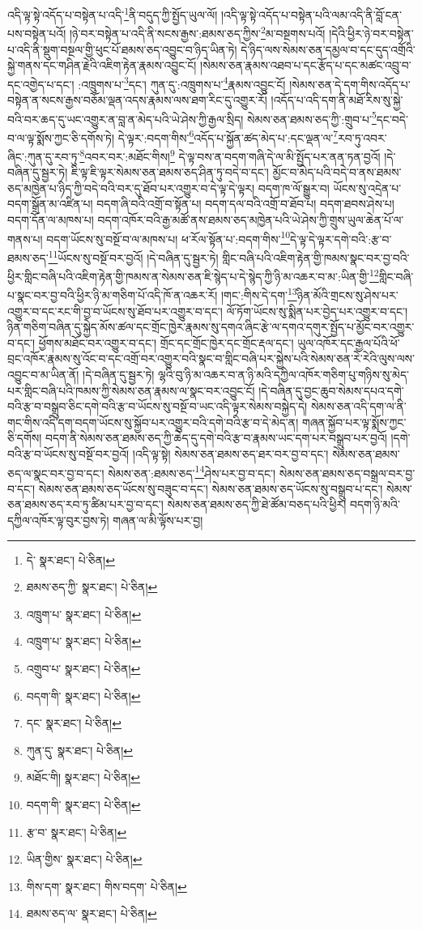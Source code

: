 འདི་ལྟ་སྟེ་འདོད་པ་བསྟེན་པ་འདི་\footnote{དེ་  སྣར་ཐང་།  པེ་ཅིན། }ནི་བདུད་ཀྱི་སྤྱོད་ཡུལ་ལོ། །འདི་ལྟ་སྟེ་འདོད་པ་བསྟེན་པའི་ལམ་འདི་ནི་བློ་ངན་པས་བསྟེན་པའོ། །ཉེ་བར་བསྟེན་པ་འདི་ནི་སངས་རྒྱས་:ཐམས་ཅད་ཀྱིས་\footnote{ཐམས་ཅད་ཀྱི་  སྣར་ཐང་།  པེ་ཅིན། }མ་བསྔགས་པའོ། །དེའི་ཕྱིར་ཉེ་བར་བསྟེན་པ་འདི་ནི་སྡུག་བསྔལ་གྱི་ཕུང་པོ་ཐམས་ཅད་འབྱུང་བ་ཉིད་ཡིན་ཏེ། དེ་ཉིད་ལས་སེམས་ཅན་དམྱལ་བ་དང་དུད་འགྲོའི་སྐྱེ་གནས་དང་གཤིན་རྗེའི་འཇིག་རྟེན་རྣམས་འབྱུང་ངོ། །སེམས་ཅན་རྣམས་འཐབ་པ་དང་རྩོད་པ་དང་མཚང་འབྲུ་བ་དང་འགྱེད་པ་དང་། :འཁྲུགས་པ་\footnote{འཁྲུག་པ་  སྣར་ཐང་།  པེ་ཅིན། }དང་། ཀུན་དུ་:འཁྲུགས་པ་\footnote{འཁྲུག་པ་  སྣར་ཐང་།  པེ་ཅིན། }རྣམས་འབྱུང་ངོ། །སེམས་ཅན་དེ་དག་གིས་འདོད་པ་བསྟེན་ན་སངས་རྒྱས་བཅོམ་ལྡན་འདས་རྣམས་ལས་ཐག་རིང་དུ་འགྱུར་རོ། །འདོད་པ་འདི་དག་ནི་མཐོ་རིས་སུ་སྐྱེ་བའི་བར་ཆད་དུ་ཡང་འགྱུར་ན་བླ་ན་མེད་པའི་ཡེ་ཤེས་ཀྱི་རྒྱལ་སྲིད། སེམས་ཅན་ཐམས་ཅད་ཀྱི་:གྲུབ་པ་\footnote{འགྲུབ་པ་  སྣར་ཐང་།  པེ་ཅིན། }དང་བདེ་བ་ལ་ལྟ་སྨོས་ཀྱང་ཅི་དགོས་ཏེ། དེ་ལྟར་:བདག་གིས་\footnote{བདག་གི་  སྣར་ཐང་།  པེ་ཅིན། }འདོད་པ་སྐྱོན་ཚད་མེད་པ་:དང་ལྡན་ལ་\footnote{དང་  སྣར་ཐང་།  པེ་ཅིན། }རབ་ཏུ་འབར་ཞིང་:ཀུན་དུ་རབ་ཏུ་\footnote{ཀུན་དུ་  སྣར་ཐང་།  པེ་ཅིན། }འབར་བར་:མཐོང་གིས།\footnote{མཐོང་གི།  སྣར་ཐང་།  པེ་ཅིན། } དེ་ལྟ་བས་ན་བདག་གཞི་དེ་ལ་མི་སྤྱོད་པར་ནན་ཏན་བྱའོ། །དེ་བཞིན་དུ་སྦྱར་ཏེ། ཇི་ལྟ་ཇི་ལྟར་སེམས་ཅན་ཐམས་ཅད་ཤིན་ཏུ་བདེ་བ་དང་། མྱོང་བ་མེད་པའི་བདེ་བ་ནས་ཐམས་ཅད་མཁྱེན་པ་ཉིད་ཀྱི་བདེ་བའི་བར་དུ་ཐོབ་པར་འགྱུར་བ་དེ་ལྟ་དེ་ལྟར། བདག་ཁ་ལོ་སྒྱུར་བ། ཡོངས་སུ་འདྲེན་པ་བདག་སྒྲོན་མ་འཛིན་པ། བདག་ཞི་བའི་འགྲོ་བ་སྟོན་པ། བདག་དལ་བའི་འགྲོ་བ་ཐོབ་པ། བདག་ཐབས་ཤེས་པ། བདག་དོན་ལ་མཁས་པ། བདག་འཁོར་བའི་རྒྱ་མཚོ་ནས་ཐམས་ཅད་མཁྱེན་པའི་ཡེ་ཤེས་ཀྱི་གྲུས་ཡུལ་ཆེན་པོ་ལ་གནས་པ། བདག་ཡོངས་སུ་བསྔོ་བ་ལ་མཁས་པ། ཕ་རོལ་སྟོན་པ་:བདག་གིས་\footnote{བདག་གི་  སྣར་ཐང་།  པེ་ཅིན། }དེ་ལྟ་དེ་ལྟར་དགེ་བའི་:རྩ་བ་ཐམས་ཅད་\footnote{རྩ་བ་  སྣར་ཐང་།  པེ་ཅིན། }ཡོངས་སུ་བསྔོ་བར་བྱའོ། །དེ་བཞིན་དུ་སྦྱར་ཏེ། གླིང་བཞི་པའི་འཇིག་རྟེན་གྱི་ཁམས་སྣང་བར་བྱ་བའི་ཕྱིར་གླིང་བཞི་པའི་འཇིག་རྟེན་གྱི་ཁམས་ན་སེམས་ཅན་ཇི་སྙེད་པ་དེ་སྙེད་ཀྱི་ཉི་མ་འཆར་བ་མ་:ཡིན་གྱི་\footnote{ཡིན་གྱིས་  སྣར་ཐང་།  པེ་ཅིན། }གླིང་བཞི་པ་སྣང་བར་བྱ་བའི་ཕྱིར་ཉི་མ་གཅིག་པོ་འདི་ཁོ་ན་འཆར་རོ། །གང་:གིས་དེ་དག་\footnote{གིས་དག་  སྣར་ཐང་། གིས་བདག་  པེ་ཅིན། }ཉིན་མོའི་གྲངས་སུ་ཤེས་པར་འགྱུར་བ་དང་རང་གི་བྱ་བ་ཡོངས་སུ་ཐོབ་པར་འགྱུར་བ་དང་། ལོ་ཏོག་ཡོངས་སུ་སྨིན་པར་བྱེད་པར་འགྱུར་བ་དང་། ཉིན་གཅིག་བཞིན་དུ་སྐྱེད་མོས་ཚལ་དང་གྲོང་ཁྱེར་རྣམས་སུ་དགའ་ཞིང་རྩེ་ལ་དགའ་དགུར་སྤྱོད་པ་མྱོང་བར་འགྱུར་བ་དང་། ཕྱོགས་མཐོང་བར་འགྱུར་བ་དང་། གྲོང་དང་གྲོང་ཁྱེར་དང་གྲོང་རྡལ་དང་། ཡུལ་འཁོར་དང་རྒྱལ་པོའི་ཕོ་བྲང་འཁོར་རྣམས་སུ་འོང་བ་དང་འགྲོ་བར་འགྱུར་བའི་སྣང་བ་གླིང་བཞི་པར་སྐྱེས་པའི་སེམས་ཅན་རེ་རེའི་ལུས་ལས་འབྱུང་བ་མ་ཡིན་ནོ། །དེ་བཞིན་དུ་སྦྱར་ཏེ། ལྷའི་བུ་ཉི་མ་འཆར་བ་ན་ཉི་མའི་དཀྱིལ་འཁོར་གཅིག་པུ་གཉིས་སུ་མེད་པར་གླིང་བཞི་པའི་ཁམས་ཀྱི་སེམས་ཅན་རྣམས་ལ་སྣང་བར་འབྱུང་ངོ། །དེ་བཞིན་དུ་བྱང་ཆུབ་སེམས་དཔའ་དགེ་བའི་རྩ་བ་བསྒྲུབ་ཅིང་དགེ་བའི་རྩ་བ་ཡོངས་སུ་བསྔོ་བ་ཡང་འདི་ལྟར་སེམས་བསྐྱེད་དེ། སེམས་ཅན་འདི་དག་ལ་ནི་གང་གིས་འདི་དག་བདག་ཡོངས་སུ་སྐྱོབ་པར་འགྱུར་བའི་དགེ་བའི་རྩ་བ་དེ་མེད་ན། གཞན་སྐྱོབ་པར་ལྟ་སྨོས་ཀྱང་ཅི་དགོས། བདག་ནི་སེམས་ཅན་ཐམས་ཅད་ཀྱི་ཆེད་དུ་དགེ་བའི་རྩ་བ་རྣམས་ཡང་དག་པར་བསྒྲུབ་པར་བྱའོ། །དགེ་བའི་རྩ་བ་ཡོངས་སུ་བསྔོ་བར་བྱའོ། །འདི་ལྟ་སྟེ། སེམས་ཅན་ཐམས་ཅད་ཐར་བར་བྱ་བ་དང་། སེམས་ཅན་ཐམས་ཅད་ལ་སྣང་བར་བྱ་བ་དང་། སེམས་ཅན་:ཐམས་ཅད་\footnote{ཐམས་ཅད་ལ་  སྣར་ཐང་།  པེ་ཅིན། }ཤེས་པར་བྱ་བ་དང་། སེམས་ཅན་ཐམས་ཅད་བསྒྲལ་བར་བྱ་བ་དང་། སེམས་ཅན་ཐམས་ཅད་ཡོངས་སུ་བཟུང་བ་དང་། སེམས་ཅན་ཐམས་ཅད་ཡོངས་སུ་བསྒྲུབ་པ་དང་། སེམས་ཅན་ཐམས་ཅད་རབ་ཏུ་ཚིམ་པར་བྱ་བ་དང་། སེམས་ཅན་ཐམས་ཅད་ཀྱི་ཐེ་ཚོམ་བཅད་པའི་ཕྱིར། བདག་ཉི་མའི་དཀྱིལ་འཁོར་ལྟ་བུར་བྱས་ཏེ། གཞན་ལ་མི་ལྟོས་པར་བྱ། 